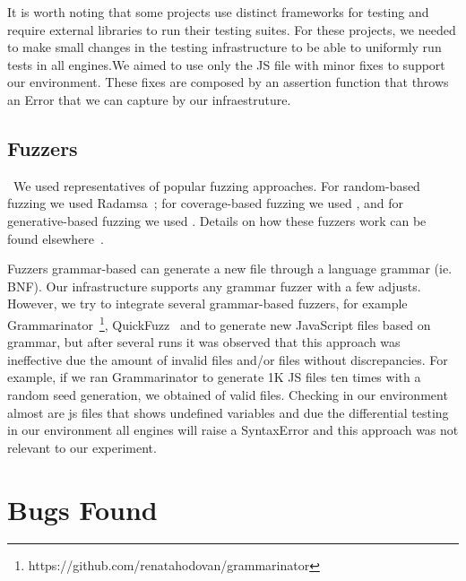\documentclass[10pt,conference,anonymous]{IEEEtran}
\begin{document}
It is worth noting that some projects use distinct frameworks for
testing and require external libraries to run their testing
suites. For these projects, we needed to make small changes in the testing
infrastructure to be able to uniformly run tests in all
engines.We aimed to use only the JS file with minor fixes
to support our environment. These fixes are composed by an assertion
function that throws an Error that we can capture by our
infraestruture.


\subsection{Fuzzers}
\label{sec:objects:fuzzers}

~We used representatives of popular fuzzing approaches. For
random-based fuzzing we used Radamsa~\cite{radamsa}; for
coverage-based fuzzing we used
, and for
generative-based fuzzing we used
. Details on how these fuzzers work can
be found elsewhere~\cite{fuzz-bart}.

Fuzzers grammar-based can generate a new file through a language grammar (ie. BNF).
Our infrastructure supports any grammar fuzzer with a few adjusts. However, 
we try to integrate several grammar-based fuzzers, for example 
Grammarinator~\footnote{https://github.com/renatahodovan/grammarinator}, QuickFuzz~\cite{grieco2016quickfuzz}
and  to generate new JavaScript files based on grammar, but 
after several runs it was observed that this approach was ineffective
due the amount of invalid files and/or files without discrepancies. For example, if we ran 
Grammarinator to generate 1K JS files ten times with a random seed generation, we obtained
 of valid files. Checking in our environment almost 
are js files that shows undefined variables and due the differential testing in our environment
all engines will raise a SyntaxError and this approach was not relevant to our experiment.

\section{Bugs Found}
\label{sec:bugs}
\end{document}
